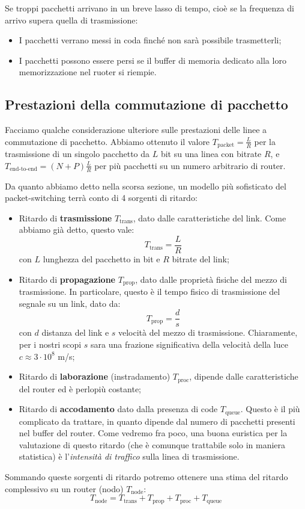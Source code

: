 \documentclass[a4paper,11pt]{article}
\begin{document}
Se troppi pacchetti arrivano in un breve lasso di tempo, cioè se la frequenza di arrivo supera quella di trasmissione:
\begin{itemize}
	\item I pacchetti verrano messi in coda finché non sarà possibile trasmetterli;
	\item I pacchetti possono essere persi se il buffer di memoria dedicato alla loro memorizzazione nel ruoter si riempie.
\end{itemize}

\subsection{Prestazioni della commutazione di pacchetto}
Facciamo qualche considerazione ulteriore sulle prestazioni delle linee a commutazione di pacchetto.
Abbiamo ottenuto il valore $T_{\text{packet}} = \frac{L}{R}$ per la trasmissione di un singolo pacchetto da $L$ bit su una linea con bitrate $R$, e $T_{\text{end-to-end}} = (N + P) \frac{L}{R}$ per più pacchetti su un numero arbitrario di router.

Da quanto abbiamo detto nella scorsa sezione, un modello più sofisticato del packet-switching terrà conto di 4 sorgenti di ritardo:
\begin{itemize}
	\item Ritardo di \textbf{trasmissione} $T_{\text{trans}}$, dato dalle caratteristiche del link. Come abbiamo già detto, questo vale:
		$$
		T_{\text{trans}} = \frac{L}{R}
		$$
		con $L$ lunghezza del pacchetto in bit e $R$ bitrate del link;
	\item Ritardo di \textbf{propagazione} $T_{\text{prop}}$, dato dalle proprietà fisiche del mezzo di trasmissione. In particolare, questo è il tempo fisico di trasmissione del segnale su un link, dato da:
		$$
		T_{\text{prop}} = \frac{d}{s}
		$$
con $d$ distanza del link e $s$ velocità del mezzo di trasmissione. Chiaramente, per i nostri scopi $s$ sara una frazione significativa della velocità della luce $c \approx 3 \cdot 10^8$ m/s;
	\item Ritardo di \textbf{laborazione} (instradamento) $T_{\text{proc}}$, dipende dalle caratteristiche del router ed è perlopiù costante;
	\item Ritardo di \textbf{accodamento} dato dalla presenza di code $T_{\text{queue}}$. Questo è il più complicato da trattare, in quanto dipende dal numero di pacchetti presenti nel buffer del router. Come vedremo fra poco, una buona euristica per la valutazione di questo ritardo (che è comunque trattabile solo in maniera statistica) è l'\textit{intensità di traffico} sulla linea di trasmissione.
\end{itemize}
Sommando queste sorgenti di ritardo potremo ottenere una stima del ritardo complessivo su un router (nodo) $T_{\text{node}}$:
$$
T_{\text{node}} = T_{\text{trans}} + T_{\text{prop}} + T_{\text{proc}} + T_{\text{queue}}
$$
\end{document}
